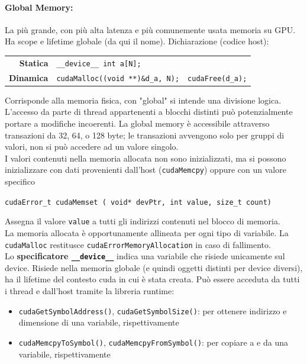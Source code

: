 \paragraph{Global Memory:} La più grande, con più alta latenza e più comunemente usata memoria su GPU. Ha scope e lifetime globale (da qui il nome). Dichiarazione (codice host):
\begin{center}
	\begin{tabular}{r | l r | }
		\cline{2-3}
		\textbf{Statica} & \texttt{\_\_device\_\_ int a[N];} & \\
		\textbf{Dinamica} & \texttt{cudaMalloc((void **)\&d\_a, N);} & \texttt{cudaFree(d\_a);} \\
		\cline{2-3}
	\end{tabular}
\end{center}

Corrisponde alla memoria fisica, con "global" si intende una divisione logica. L'accesso da parte di thread appartenenti a blocchi distinti può potenzialmente portare a modifiche incoerenti. La global memory è accessibile attraverso transazioni da 32, 64, o 128 byte; le transazioni avvengono solo per gruppi di valori, non si può accedere ad un valore singolo. \\

I valori contenuti nella memoria allocata non sono inizializzati, ma si possono inizializzare con dati provenienti dall'host (\texttt{cudaMemcpy}) oppure con un valore specifico
\begin{center}
	\texttt{cudaError\_t cudaMemset ( void* devPtr, int value, size\_t count)}
\end{center}
Assegna il valore \texttt{value} a tutti gli indirizzi contenuti nel blocco di memoria.\\
La memoria allocata è opportunamente allineata per ogni tipo di variabile. La \texttt{cudaMalloc} restitusce \texttt{cudaErrorMemoryAllocation} in caso di fallimento.\\

Lo \textbf{specificatore \texttt{\_\_device\_\_}} indica una variabile che risiede unicamente sul device. Risiede nella memoria globale (e quindi oggetti distinti per device diversi), ha il lifetime del contesto cuda in cui è stata creata. Può essere acceduta da tutti i thread e dall'host tramite la libreria runtime:
\begin{itemize}
	\item \texttt{cudaGetSymbolAddress()}, \texttt{cudaGetSymbolSize()}: per ottenere indirizzo e dimensione di una variabile, rispettivamente
	\item \texttt{cudaMemcpyToSymbol()}, \texttt{cudaMemcpyFromSymbol()}: per copiare a e da una variabile, rispettivamente
\end{itemize}

